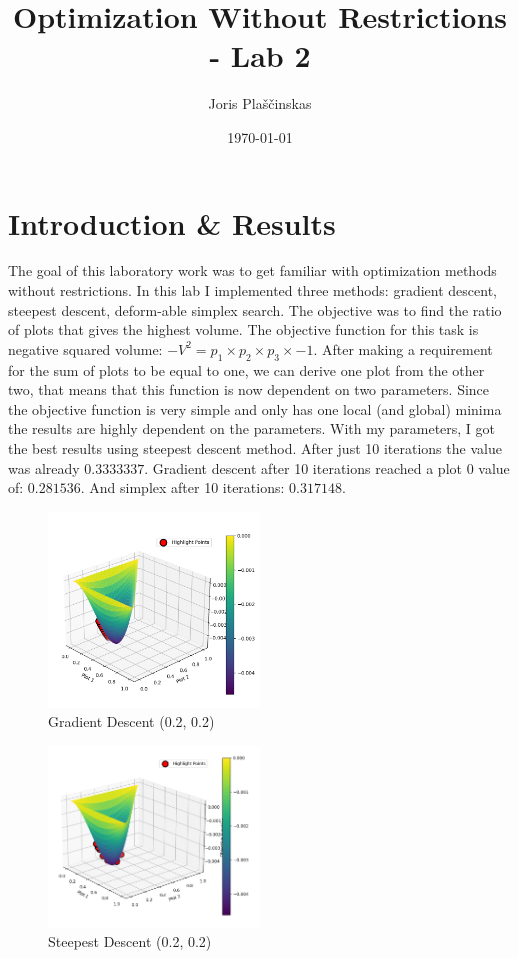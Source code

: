 \documentclass{article}
\title{Optimization Without Restrictions - Lab 2}
\author{Joris Plaščinskas}
\date{\today}
\begin{document}
    \maketitle
    \section*{Introduction \& Results}
        The goal of this laboratory work was to get familiar with optimization methods without restrictions. In this lab I implemented three methods: gradient descent, steepest descent, deform-able simplex search. The objective was to find the ratio of plots that gives the highest volume. The objective function for this task is negative squared volume: $-V^2 = p_1 \times p_2 \times p_3 \times -1$. After making a requirement for the sum of plots to be equal to one, we can derive one plot from the other two, that means that this function is now dependent on two parameters. Since the objective function is very simple and only has one local (and global) minima the results are highly dependent on the parameters. With my parameters, I got the best results using steepest descent method. After just 10 iterations the value was already $0.3333337$. Gradient descent after 10 iterations reached a plot 0 value of: $0.281536$. And simplex after 10 iterations: $0.317148$.
        \begin{figure}[H]
            \centering
            \includegraphics[width=0.5\textwidth]{gradient-02.png}
            \caption{Gradient Descent (0.2, 0.2)}
        \end{figure}
        \begin{figure}[H]
            \centering
            \includegraphics[width=0.5\textwidth]{simplex-02.png}
            \caption{Steepest Descent (0.2, 0.2)}
        \end{figure}
\end{document}
